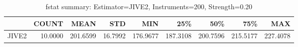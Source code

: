 \begin{table}[ht]
\centering
\caption{fstat summary: Estimator=JIVE2, Instruments=200, Strength=0.20}
\begin{tabular}{lrrrrrrrr}
\toprule
 & COUNT & MEAN & STD & MIN & 25\% & 50\% & 75\% & MAX \\
\midrule
JIVE2 & 10.0000 & 201.6599 & 16.7992 & 176.9677 & 187.3108 & 200.7596 & 215.5177 & 227.4078 \\
\bottomrule
\end{tabular}
\end{table}
